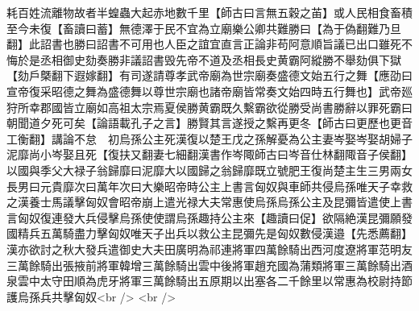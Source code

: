 耗百姓流離物故者半蝗蟲大起赤地數千里【師古曰言無五穀之苖】或人民相食畜積至今未復【畜讀曰蓄】無德澤于民不宜為立廟樂公卿共難勝曰【為于偽翻難乃旦翻】此詔書也勝曰詔書不可用也人臣之誼宜直言正論非苟阿意順旨議已出口雖死不悔於是丞相御史劾奏勝非議詔書毁先帝不道及丞相長史黄霸阿縱勝不舉劾俱下獄【劾戶槩翻下遐嫁翻】有司遂請尊孝武帝廟為世宗廟奏盛德文始五行之舞【應劭曰宣帝復采昭德之舞為盛德舞以尊世宗廟也諸帝廟皆常奏文始四時五行舞也】武帝廵狩所幸郡國皆立廟如高祖太宗焉夏侯勝黄霸既久繫霸欲從勝受尚書勝辭以罪死霸曰朝聞道夕死可矣【論語載孔子之言】勝賢其言遂授之繫再更冬【師古曰更歷也更音工衡翻】講論不怠　初烏孫公主死漢復以楚王戊之孫解憂為公主妻岑娶岑娶胡婦子泥靡尚小岑娶且死【復扶又翻妻七細翻漢書作岑陬師古曰岑音仕林翻陬音子侯翻】以國與季父大禄子翁歸靡曰泥靡大以國歸之翁歸靡既立號肥王復尚楚主生三男兩女長男曰元貴靡次曰萬年次曰大樂昭帝時公主上書言匈奴與車師共侵烏孫唯天子幸救之漢養士馬議擊匈奴會昭帝崩上遣光禄大夫常惠使烏孫烏孫公主及昆彌皆遣使上書言匈奴復連發大兵侵擊烏孫使使謂烏孫趣持公主來【趣讀曰促】欲隔絶漢昆彌願發國精兵五萬騎盡力擊匈奴唯天子出兵以救公主昆彌先是匈奴數侵漢邉【先悉薦翻】漢亦欲討之秋大發兵遣御史大夫田廣明為祁連將軍四萬餘騎出西河度遼將軍范明友三萬餘騎出張掖前將軍韓增三萬餘騎出雲中後將軍趙充國為蒲類將軍三萬餘騎出酒泉雲中太守田順為虎牙將軍三萬餘騎出五原期以出塞各二千餘里以常惠為校尉持節護烏孫兵共擊匈奴<br />
<br />
